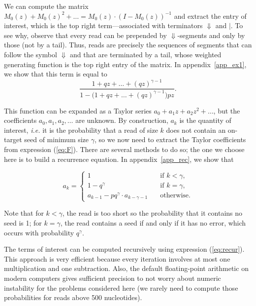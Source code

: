 \documentclass{article}
\begin{document}
We can compute the matrix $M_0(z) + M_0(z)^2 + \ldots = M_0(z) \cdot
(I-M_0(z))^{-1}$ and extract the entry of interest, which is the top right
term---associated with terminators $\Downarrow$ and $|$. To see why,
observe that every read can be prepended by $\Downarrow$-segments and only
by those (not by a tail). Thus, reads are precisely the sequences of
segments that can follow the symbol $\Downarrow$ and that are terminated
by a tail, whose weighted generating function is the top right entry of
the matrix. In appendix~\ref{app_ex1}, we show that this term is equal to
\begin{equation}
\label{eq:F}
\frac{1+qz+\ldots+(qz)^{\gamma-1}}
  {1-\big(1+qz+\ldots+(qz)^{\gamma-1} \big) pz}.
\end{equation}

This function can be expanded as a Taylor series $a_0 + a_1z + a_2z^2 +
\ldots$, but the coefficients $a_0, a_1, a_2, \ldots$ are unknown. By
construction, $a_k$ is the quantity of interest, \textit{i.e.} it is the
probability that a read of size $k$ does not contain an on-target seed of
minimum size $\gamma$, so we now need to extract the Taylor coefficients
from expression (\ref{eq:F}). There are several methods to do so; the one
we choose here is to build a recurrence equation. In
appendix~\ref{app_rec}, we show that

\begin{equation}
\label{eq:recur}
a_k = 
\begin{cases}
1            &\quad\text{if } k < \gamma, \\
1 -q^\gamma &\quad\text{if } k = \gamma, \\
a_{k-1} -pq^\gamma \cdot a_{k-\gamma-1} &\quad\text{otherwise.}
\end{cases}
\end{equation}

Note that for $k < \gamma$, the read is too short so the probability that
it contains no seed is 1; for $k = \gamma$, the read contains a seed if
and only if it has no error, which occurs with probability $q^\gamma$.

The terms of interest can be computed recursively using expression
(\ref{eq:recur}). This approach is very efficient because every iteration
involves at most one multiplication and one subtraction. Also, the default
floating-point arithmetic on modern computers gives sufficient precision
to not worry about numeric instability for the problems considered here
(we rarely need to compute those probabilities for reads above 500
nucleotides).
\end{document}
